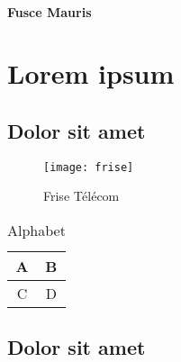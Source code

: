 \documentclass[12pt,a4paper]{article}
\begin{document}
\paragraph{Fusce Mauris}
\lipsum[1]

\section{Lorem ipsum}
\subsection{Dolor sit amet}

\begin{figure}[h]
	\centering
	\texttt{[image: frise]}
	\caption{Frise Télécom}
\end{figure}

\lipsum[1]

\begin{table}[h]
	\centering
	\begin{tabular}{|c|c|}
	\hline A & B \\
	\hline C & D \\
	\hline
	\end{tabular}
	\caption{Alphabet}
\end{table}

\subsection{Dolor sit amet}
\lipsum[1-3]
\end{document}
